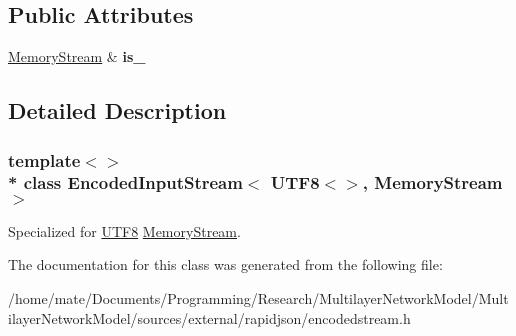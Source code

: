 \subsection*{Public Attributes}
\begin{DoxyCompactItemize}
\item 
\hyperlink{structMemoryStream}{Memory\+Stream} \& {\bfseries is\+\_\+}\hypertarget{classEncodedInputStream_3_01UTF8_3_4_00_01MemoryStream_01_4_ad5e48564bbd14297a4cc445af3a4aa83}{}\label{classEncodedInputStream_3_01UTF8_3_4_00_01MemoryStream_01_4_ad5e48564bbd14297a4cc445af3a4aa83}

\end{DoxyCompactItemize}


\subsection{Detailed Description}
\subsubsection*{template$<$$>$\\*
class Encoded\+Input\+Stream$<$ U\+T\+F8$<$$>$, Memory\+Stream $>$}

Specialized for \hyperlink{structUTF8}{U\+T\+F8} \hyperlink{structMemoryStream}{Memory\+Stream}. 

The documentation for this class was generated from the following file\+:\begin{DoxyCompactItemize}
\item 
/home/mate/\+Documents/\+Programming/\+Research/\+Multilayer\+Network\+Model/\+Multilayer\+Network\+Model/sources/external/rapidjson/encodedstream.\+h\end{DoxyCompactItemize}
